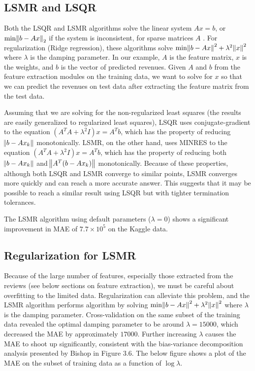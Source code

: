 \documentclass[11pt]{amsart}
\begin{document}
\subsection{LSMR and LSQR}

Both the LSQR and LSMR algorithms solve the linear system $Ax=b$, or $\text{min}\norm{b-Ax}_2$ if the system is inconsistent, for sparse matrices $A$ \cite{LSMR}. For regularization (Ridge regression), these algorithms solve $\text{min}\norm{b-Ax}^2+\lambda^2\norm{x}^2$ where $\lambda$ is the damping parameter. In our example, $A$ is the feature matrix, $x$ is the weights, and $b$ is the vector of predicted revenues. Given $A$ and $b$ from the feature extraction modules on the training data, we want to solve for $x$ so that we can predict the revenues on test data after extracting the feature matrix from the test data.

Assuming that we are solving for the non-regularized least squares (the results are easily generalized to regularized least squares), LSQR uses conjugate-gradient to the equation $(A^TA+\lambda^2I)x=A^Tb$, which has the property of reducing $\norm{b-Ax_k}$ monotonically. LSMR, on the other hand, uses MINRES to the equation $(A^TA+\lambda^2I)x=A^Tb$, which has the property of reducing both $\norm{b-Ax_k}$ and $\norm{A^T(b-Ax_k)}$ monotonically. Because of these properties, although both LSQR and LSMR converge to similar points, LSMR converges more quickly and can reach a more accurate answer. This suggests that it may be possible to reach a similar result using LSQR but with tighter termination tolerances.

The LSMR algorithm using default parameters ($\lambda=0$) shows a significant improvement in MAE of $7.7\times10^5$ on the Kaggle data.

\subsection{Regularization for LSMR}
Because of the large number of features, especially those extracted from the reviews (see below sections on feature extraction), we must be careful about overfitting to the limited data. Regularization can alleviate this problem, and the LSMR algorithm performs algorithm by solving $\text{min}\norm{b-Ax}^2+\lambda^2\norm{x}^2$ where $\lambda$ is the damping parameter. Cross-validation on the same subset of the training data revealed the optimal damping parameter to be around $\lambda=15000$, which decreased the MAE by approximately $17000$. Further increasing $\lambda$ causes the MAE to shoot up significantly, consistent with the bias-variance decomposition analysis presented by Bishop in Figure 3.6. The below figure shows a plot of the MAE on the subset of training data as a function of $\log{\lambda}$.
\end{document}
